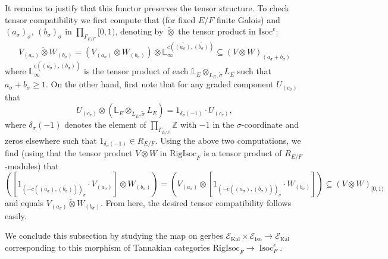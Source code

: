 \documentclass[11pt]{amsart}
\theoremstyle{definition}
\newcommand{\mc}{\mathcal}
\newcommand{\Z}{\mathbb{Z}}
\newcommand{\ov}{\overline}
\newcommand{\RigIsoc}{\mathrm{RigIsoc}}
\DeclareMathOperator{\Kal}{Kal}
\DeclareMathOperator{\Isoc}{Isoc}
\begin{document}
It remains to justify that this functor preserves the tensor structure. To check tensor compatibility we first compute that (for fixed $E/F$ finite Galois) and $(a_{\sigma})_{\sigma}$, $(b_{\sigma})_{\sigma}$ in $\prod_{\Gamma_{E/F}} [0,1)$, denoting by $\tilde{\otimes}$ the tensor product in $\text{Isoc}^{e}$:
\begin{equation*}
V_{(a_{\sigma})} \tilde{\otimes} W_{(b_{\sigma})} = (V_{(a_{\sigma})} \otimes W_{(b_{\sigma})}) \otimes \mathbb{L}_{\infty}^{c(\ov{(a_{\sigma})}, \ov{(b_{\sigma})})} \subseteq (V \otimes W)_{(a_{\sigma} + b_{\sigma})}
\end{equation*}
where $\mathbb{L}^{c(\ov{(a_{\sigma})}, \ov{(b_{\sigma})})}_{\infty}$
is the tensor product of each $\mathbb{L}_{E} \otimes_{L_{E}, \tilde{\sigma}} L_{E}$ such that $a_{\sigma} + b_{\sigma} \geq 1$. On the other hand, first note that for any graded component $U_{(c_{\sigma})}$ that
\begin{equation*}
U_{(c_{\tau})} \otimes (\mathbb{L}_{E} \otimes_{L_{E}, \tilde{\sigma}} L_{E}) = 1_{\delta_{\sigma}(-1)} \cdot U_{(c_{\tau})},
\end{equation*}
where $\delta_{\sigma}(-1)$ denotes the element of $\prod_{\Gamma_{E/F}}\Z$ with $-1$ in the $\sigma$-coordinate and zeros elsewhere such that  $1_{\delta_{\sigma}(-1)} \in R_{E/F}$. Using the above two computations, we find (using that the tensor product $V \otimes W$ in $\RigIsoc_{F}$ is a tensor product of $R_{E/F}$-modules) that
\begin{equation*}
    ([1_{(-c(\ov{(a_{\sigma})}, \ov{(b_{\sigma})}))_{\sigma}} \cdot V_{(a_{\sigma})}] \otimes W_{(b_{\sigma})}) = (V_{(a_{\sigma})} \otimes [1_{(-c(\ov{(a_{\sigma})}, \ov{(b_{\sigma})}))_{\sigma}} \cdot W_{(b_{\sigma})}])  \subseteq (V \otimes W)_{[0,1)}
\end{equation*}
and equals $V_{(a_{\sigma})} \tilde{\otimes} W_{(b_{\sigma})}$. From here, the desired tensor compatibility follows easily. 
 
We conclude this subsection by studying the map on gerbes $\mc{E}_{\Kal} \times \mc{E}_{\text{iso}} \to \mc{E}_{\Kal}$ corresponding to this morphism of Tannakian categories $\RigIsoc_{F} \to \Isoc_{F}^{e}$.
\end{document}
